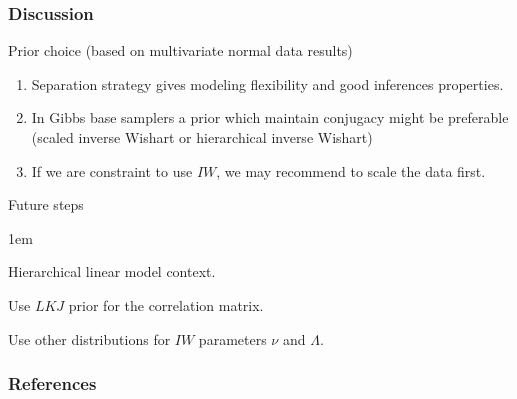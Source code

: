 \documentclass[9pt]{beamer}\usepackage[]{graphicx}\usepackage[]{color}
\begin{document}
\begin{frame}
\frametitle{Discussion}
Prior choice (based on multivariate normal data results)
\begin{enumerate} \itemsep1em
\item Separation strategy  gives modeling flexibility and good inferences properties. \citep{barnard2000}
\item In Gibbs base samplers a prior which maintain conjugacy might be preferable (scaled inverse Wishart or hierarchical inverse Wishart) 
\item If we are constraint to use $IW$, we may recommend to scale the data first.
\end{enumerate}  
\vspace{.5cm}

Future steps
\begin{description} \itemsep1em
\item[Different Model] Hierarchical linear model context. 

\item[Different Priors] Use $LKJ$ prior for the correlation matrix. 

Use other distributions for $IW$ parameters $\nu$ and $\Lambda$.
\end{description}
\end{frame}


\begin{frame}
\frametitle{References}
        
\small{   }
\end{frame}
\end{document}
